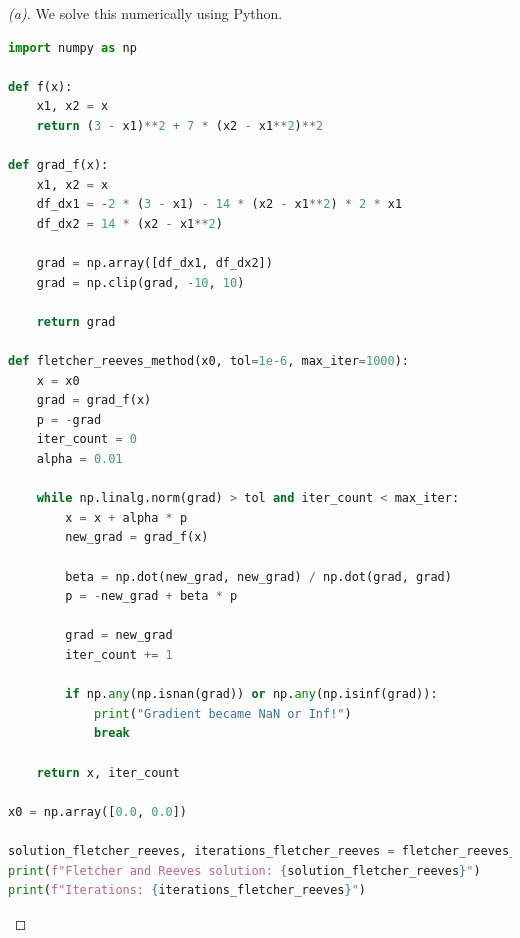 \documentclass{article}
\begin{document}
\begin{proof}[(a)]
We solve this numerically using Python. 
\begin{lstlisting}[language=Python]
import numpy as np

def f(x):
    x1, x2 = x
    return (3 - x1)**2 + 7 * (x2 - x1**2)**2

def grad_f(x):
    x1, x2 = x
    df_dx1 = -2 * (3 - x1) - 14 * (x2 - x1**2) * 2 * x1
    df_dx2 = 14 * (x2 - x1**2)
    
    grad = np.array([df_dx1, df_dx2])
    grad = np.clip(grad, -10, 10)
    
    return grad

def fletcher_reeves_method(x0, tol=1e-6, max_iter=1000):
    x = x0
    grad = grad_f(x)
    p = -grad  
    iter_count = 0
    alpha = 0.01
    
    while np.linalg.norm(grad) > tol and iter_count < max_iter:
        x = x + alpha * p
        new_grad = grad_f(x)
        
        beta = np.dot(new_grad, new_grad) / np.dot(grad, grad)
        p = -new_grad + beta * p
        
        grad = new_grad
        iter_count += 1
        
        if np.any(np.isnan(grad)) or np.any(np.isinf(grad)):
            print("Gradient became NaN or Inf!")
            break
    
    return x, iter_count

x0 = np.array([0.0, 0.0])

solution_fletcher_reeves, iterations_fletcher_reeves = fletcher_reeves_method(x0)
print(f"Fletcher and Reeves solution: {solution_fletcher_reeves}")
print(f"Iterations: {iterations_fletcher_reeves}")
\end{lstlisting}
\end{proof}
\end{document}
